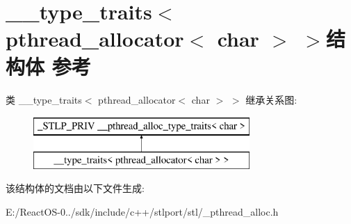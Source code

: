 \hypertarget{struct____type__traits_3_01pthread__allocator_3_01char_01_4_01_4}{}\section{\+\_\+\+\_\+type\+\_\+traits$<$ pthread\+\_\+allocator$<$ char $>$ $>$结构体 参考}
\label{struct____type__traits_3_01pthread__allocator_3_01char_01_4_01_4}
类 \+\_\+\+\_\+type\+\_\+traits$<$ pthread\+\_\+allocator$<$ char $>$ $>$ 继承关系图\+:\begin{figure}[H]
\begin{center}
\leavevmode
\includegraphics[height=2.000000cm]{struct____type__traits_3_01pthread__allocator_3_01char_01_4_01_4}
\end{center}
\end{figure}


该结构体的文档由以下文件生成\+:\begin{DoxyCompactItemize}
\item 
E\+:/\+React\+O\+S-\/0../sdk/include/c++/stlport/stl/\+\_\+pthread\+\_\+alloc.\+h\end{DoxyCompactItemize}
